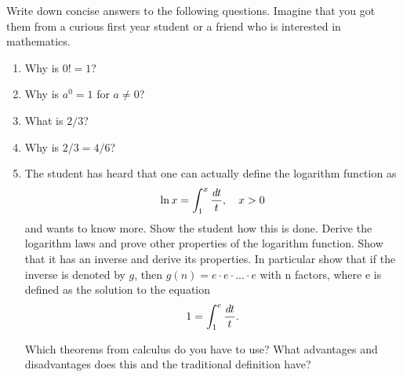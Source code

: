 \begin{assignment}
Write down concise answers to the following questions. Imagine that you
got them from a curious first year student or a friend who is interested in
mathematics.
\begin{enumerate}[wide]
\item Why is $0! = 1$?
\item Why is $a^0 = 1$ for $a \neq 0$?
\item What is $2/3$?
\item Why is $2/3 = 4/6$?
\item The student has heard that one can actually define the logarithm
function as
\[
\ln x =\int_1^x \frac{\emph{d} t}{t}, \quad x >0
\]
and wants to know more. Show the student how this is done. Derive the logarithm laws and prove other properties of the logarithm function. Show that it has an inverse and derive its properties. In particular show that if the inverse is denoted by $g$, then $g(n) = e·e·. . .·e$
with n factors, where e is defined as the solution to the equation
\[
1 =\int_1^e \frac{\emph{d} t}{t}.
\]

Which theorems from calculus do you have to use? What advantages
and disadvantages does this and the traditional definition have?
\end{enumerate}
\end{assignment}
